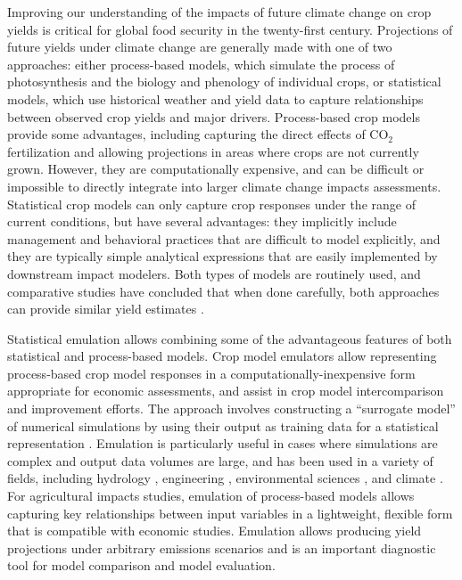 \documentclass[gmd, manuscript]{copernicus} %
\begin{document}

\introduction
\label{S:1}
Improving our understanding of the impacts of future climate change on crop yields is critical for global food security in the twenty-first century. 
Projections of future yields under climate change are generally made with one of two approaches: either process-based models, which  simulate the process of photosynthesis and the biology and phenology of individual crops, or statistical models, which use historical weather and yield data to capture relationships between observed crop yields and major drivers.
Process-based crop models provide some advantages, including capturing the direct effects of CO$_2$ fertilization and allowing projections in areas where crops are not currently grown. 
However, they are computationally expensive, and can be difficult or impossible to directly integrate into larger climate change impacts assessments.
Statistical crop models can only capture crop responses under the range of current conditions, but have several advantages: they implicitly include management and behavioral practices that are difficult to model explicitly, and they are typically simple analytical expressions that are easily implemented by downstream impact modelers. 
Both types of models are routinely used, and comparative studies have concluded that when done carefully, both approaches can provide similar yield estimates \citep[e.g.][]{Lobell2010, Moore2017, Roberts2017, zhao2017}. 

Statistical emulation allows combining some of the advantageous features of both statistical and process-based models.
Crop model emulators allow representing process-based crop model responses in a computationally-inexpensive form appropriate for economic assessments, and assist in crop model intercomparison and improvement efforts.
The approach involves constructing a ``surrogate model'' of numerical simulations by using their output as training data for a statistical representation \citep[e.g.][]{OHAGAN2006, OHAGAN2010}. 
Emulation is particularly useful in cases where simulations are complex and output data volumes are large, and has been used in a variety of fields, including hydrology \citep[e.g.][]{Razavi2012}, engineering \citep[e.g.][]{STORLIE2009}, environmental sciences \citep[e.g.][]{RATTO2012}, and climate \citep[e.g.][]{Castruccio14, Holden2014}. 
For agricultural impacts studies, emulation of process-based models allows capturing key relationships between input variables in a lightweight, flexible form that is compatible with economic studies. Emulation allows producing yield projections under arbitrary emissions scenarios and is an important diagnostic tool for model comparison and model evaluation.
\end{document}
